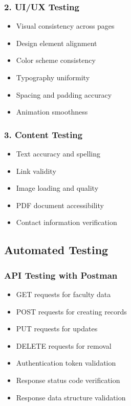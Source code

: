 \documentclass[12pt,a4paper]{report}
\begin{document}
\subsubsection*{2. UI/UX Testing}
\begin{itemize}
    \item Visual consistency across pages
    \item Design element alignment
    \item Color scheme consistency
    \item Typography uniformity
    \item Spacing and padding accuracy
    \item Animation smoothness
\end{itemize}

\subsubsection*{3. Content Testing}
\begin{itemize}
    \item Text accuracy and spelling
    \item Link validity
    \item Image loading and quality
    \item PDF document accessibility
    \item Contact information verification
\end{itemize}

\subsection{Automated Testing}

\subsubsection*{API Testing with Postman}
\begin{itemize}
    \item GET requests for faculty data
    \item POST requests for creating records
    \item PUT requests for updates
    \item DELETE requests for removal
    \item Authentication token validation
    \item Response status code verification
    \item Response data structure validation
\end{itemize}
\end{document}
